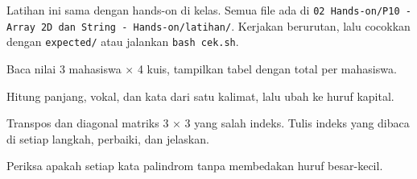 \documentclass[a4paper]{article}
\begin{document}
Latihan ini sama dengan hands-on di kelas. Semua file ada di \texttt{02 Hands-on/P10 - Array 2D dan String - Hands-on/latihan/}. Kerjakan berurutan, lalu cocokkan dengan \texttt{expected/} atau jalankan \texttt{bash cek.sh}.
\par\vspace{4pt}\par\vspace{6pt}
Baca nilai 3 mahasiswa × 4 kuis, tampilkan tabel dengan total per mahasiswa.

Hitung panjang, vokal, dan kata dari satu kalimat, lalu ubah ke huruf kapital.

Transpos dan diagonal matriks 3 × 3 yang salah indeks. Tulis indeks yang dibaca di setiap langkah, perbaiki, dan jelaskan.

Periksa apakah setiap kata palindrom tanpa membedakan huruf besar-kecil.
\end{document}
